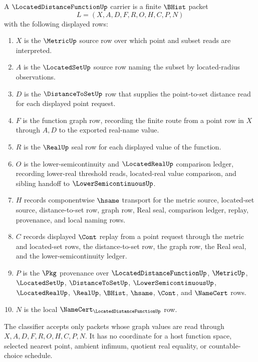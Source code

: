 \begin{definition}
\label{def:located-distance-function-carrier}
A $\LocatedDistanceFunctionUp$ carrier is a finite $\BHist$ packet
$$
L=(X,A,D,F,R,O,H,C,P,N)
$$
with the following displayed rows:
\begin{enumerate}
\item $X$ is the $\MetricUp$ source row over which point and subset reads are interpreted.
\item $A$ is the $\LocatedSetUp$ source row naming the subset by located-radius observations.
\item $D$ is the $\DistanceToSetUp$ row that supplies the point-to-set distance read for each displayed point request.
\item $F$ is the function graph row, recording the finite route from a point row in $X$ through $A,D$ to the exported real-name value.
\item $R$ is the $\RealUp$ seal row for each displayed value of the function.
\item $O$ is the lower-semicontinuity and $\LocatedRealUp$ comparison ledger, recording lower-real threshold reads, located-real value comparison, and sibling handoff to $\LowerSemicontinuousUp$.
\item $H$ records componentwise $\hsame$ transport for the metric source, located-set source, distance-to-set row, graph row, Real seal, comparison ledger, replay, provenance, and local naming rows.
\item $C$ records displayed $\Cont$ replay from a point request through the metric and located-set rows, the distance-to-set row, the graph row, the Real seal, and the lower-semicontinuity ledger.
\item $P$ is the $\Pkg$ provenance over $\LocatedDistanceFunctionUp$, $\MetricUp$, $\LocatedSetUp$, $\DistanceToSetUp$, $\LowerSemicontinuousUp$, $\LocatedRealUp$, $\RealUp$, $\BHist$, $\hsame$, $\Cont$, and $\NameCert$ rows.
\item $N$ is the local $\NameCert_{\LocatedDistanceFunctionUp}$ row.
\end{enumerate}
The classifier accepts only packets whose graph values are read through $X,A,D,F,R,O,H,C,P,N$. It has no coordinate for a host function space, selected nearest point, ambient infimum, quotient real equality, or countable-choice schedule.
\end{definition}

